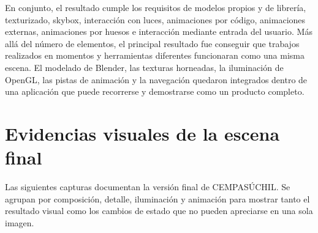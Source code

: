 \documentclass[letter,12pt]{article}
\begin{document}
En conjunto, el resultado cumple los requisitos de modelos propios y de librería, texturizado, skybox, interacción con luces, animaciones por código, animaciones externas, animaciones por huesos e interacción mediante entrada del usuario. Más allá del número de elementos, el principal resultado fue conseguir que trabajos realizados en momentos y herramientas diferentes funcionaran como una misma escena. El modelado de Blender, las texturas horneadas, la iluminación de OpenGL, las pistas de animación y la navegación quedaron integrados dentro de una aplicación que puede recorrerse y demostrarse como un producto completo.

\section{Evidencias visuales de la escena final}

	Las siguientes capturas documentan la versión final de CEMPASÚCHIL. Se agrupan por composición, detalle, iluminación y animación para mostrar tanto el resultado visual como los cambios de estado que no pueden apreciarse en una sola imagen.
\end{document}
